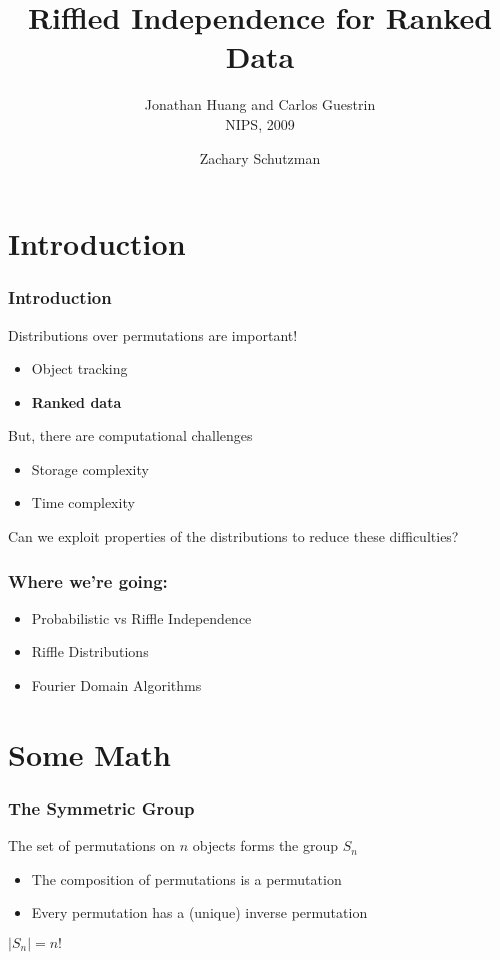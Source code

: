 \documentclass{beamer} %
\title{Riffled Independence for Ranked Data}
\subtitle{Jonathan Huang and Carlos Guestrin \\ NIPS, 2009}
\author{Zachary Schutzman}
\institute{University of Pennsylvania}
\theoremstyle{definition} %
\def \pausenl {\pause $ \ $\\}
\begin{document}
\begin{frame} 
\titlepage
\end{frame}

\section{Introduction}
\begin{frame}
	\frametitle{Introduction}
\pause
Distributions over permutations are important!
\pause
\begin{itemize}
	\item Object tracking \pause
	\item \textbf{Ranked data}
	\end{itemize}
	
	\pausenl
	But, there are computational challenges
	\begin{itemize}
		\item Storage complexity \pause
		\item Time complexity
		\end{itemize}
		
		\pausenl
		
	Can we exploit properties of the distributions to reduce these difficulties?

\end{frame}
\begin{frame}
	\frametitle{Where we're going:}
	\begin{itemize}
		\item Probabilistic vs Riffle Independence
		\pause
		\item Riffle Distributions \pause
		\item Fourier Domain Algorithms
	\end{itemize}
\end{frame}

\section{Some Math}

\begin{frame}
	\frametitle{The Symmetric Group}
	\pause
	The set of permutations on $n$ objects forms the group $S_n$\pause
	\begin{itemize}
		\item The composition of permutations is a permutation\pause
		\item Every permutation has a (unique) inverse permutation
	\end{itemize}
	\pause
	$|S_n| = n!$
\end{frame}
\end{document}
